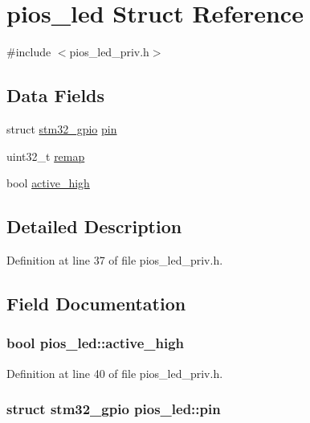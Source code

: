\hypertarget{structpios__led}{\section{pios\-\_\-led \-Struct \-Reference}
\label{structpios__led}
}


{\ttfamily \#include $<$pios\-\_\-led\-\_\-priv.\-h$>$}

\subsection*{\-Data \-Fields}
\begin{DoxyCompactItemize}
\item 
struct \hyperlink{structstm32__gpio}{stm32\-\_\-gpio} \hyperlink{structpios__led_a11fcfad24672a8ba07ab81baea1dffaa}{pin}
\item 
uint32\-\_\-t \hyperlink{structpios__led_ab372d17fd1c41d5366ac92b402773710}{remap}
\item 
bool \hyperlink{structpios__led_a628f51c582805e453bed30e26e7853fd}{active\-\_\-high}
\end{DoxyCompactItemize}


\subsection{\-Detailed \-Description}


\-Definition at line 37 of file pios\-\_\-led\-\_\-priv.\-h.



\subsection{\-Field \-Documentation}
\hypertarget{structpios__led_a628f51c582805e453bed30e26e7853fd}{
\subsubsection[{active\-\_\-high}]{\setlength{\rightskip}{0pt plus 5cm}bool {\bf pios\-\_\-led\-::active\-\_\-high}}}\label{structpios__led_a628f51c582805e453bed30e26e7853fd}


\-Definition at line 40 of file pios\-\_\-led\-\_\-priv.\-h.

\hypertarget{structpios__led_a11fcfad24672a8ba07ab81baea1dffaa}{
\subsubsection[{pin}]{\setlength{\rightskip}{0pt plus 5cm}struct {\bf stm32\-\_\-gpio} {\bf pios\-\_\-led\-::pin}}}\label{structpios__led_a11fcfad24672a8ba07ab81baea1dffaa}


